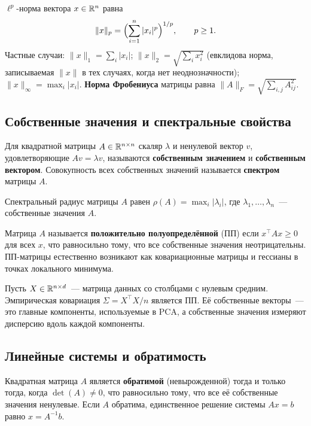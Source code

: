 \begin{definition}[Нормы]
\label{def:norms}
$\ell^p$-норма вектора $x \in \mathbb{R}^n$ равна
\[
    \|x\|_p = \Bigl(\sum_{i=1}^n |x_i|^p\Bigr)^{1/p}, \qquad p \geq 1.
\]
Частные случаи: $\|x\|_1 = \sum_i |x_i|$; $\|x\|_2 = \sqrt{\sum_i x_i^2}$ (евклидова норма, записываемая $\|x\|$ в тех случаях, когда нет неоднозначности); $\|x\|_\infty = \max_i |x_i|$. \textbf{Норма Фробениуса} матрицы равна $\|A\|_F = \sqrt{\sum_{i,j} A_{ij}^2}$.
\end{definition}

\subsection*{Собственные значения и спектральные свойства}

Для квадратной матрицы $A \in \mathbb{R}^{n \times n}$ скаляр $\lambda$ и ненулевой вектор $v$, удовлетворяющие $Av = \lambda v$, называются \textbf{собственным значением} и \textbf{собственным вектором}. Совокупность всех собственных значений называется \textbf{спектром} матрицы $A$.

\begin{definition}
\label{def:spectral-radius}
Спектральный радиус матрицы $A$ равен $\rho(A) = \max_i |\lambda_i|$, где $\lambda_1, \ldots, \lambda_n$~--- собственные значения $A$.
\end{definition}

Матрица $A$ называется \textbf{положительно полуопределённой} (ПП) если $x^\top A x \geq 0$ для всех $x$, что равносильно тому, что все собственные значения неотрицательны. ПП-матрицы естественно возникают как ковариационные матрицы и гессианы в точках локального минимума.

\begin{example}
Пусть $X \in \mathbb{R}^{n \times d}$~--- матрица данных со столбцами с нулевым средним. Эмпирическая ковариация $\Sigma = X^\top X / n$ является ПП. Её собственные векторы~--- это главные компоненты, используемые в PCA, а собственные значения измеряют дисперсию вдоль каждой компоненты.
\end{example}

\subsection*{Линейные системы и обратимость}

Квадратная матрица $A$ является \textbf{обратимой} (невырожденной) тогда и только тогда, когда $\det(A) \neq 0$, что равносильно тому, что все её собственные значения ненулевые. Если $A$ обратима, единственное решение системы $Ax = b$ равно $x = A^{-1}b$.

